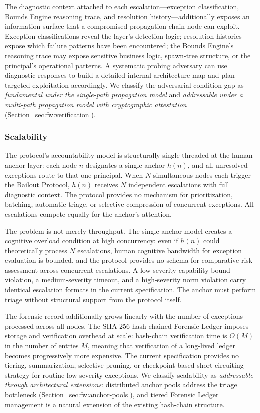The diagnostic context attached to each escalation---exception classification, Bounds Engine reasoning trace, and resolution history---additionally exposes an information surface that a compromised propagation-chain node can exploit. Exception classifications reveal the \bounds{} layer's detection logic; resolution histories expose which failure patterns have been encountered; the Bounds Engine's reasoning trace may expose sensitive business logic, spawn-tree structure, or the principal's operational patterns. A systematic probing adversary can use diagnostic responses to build a detailed internal architecture map and plan targeted exploitation accordingly. We classify the adversarial-condition gap as \emph{fundamental under the single-path propagation model} and \emph{addressable under a multi-path propagation model with cryptographic attestation} (Section~\ref{sec:fw:verification}).

\subsubsection{Scalability}
\label{sec:lim:scalability}

The protocol's accountability model is structurally single-threaded at the human anchor layer: each node $n$ designates a single anchor $h(n)$, and all unresolved exceptions route to that one principal. When $N$ simultaneous nodes each trigger the Bailout Protocol, $h(n)$ receives $N$ independent escalations with full diagnostic context. The protocol provides no mechanism for prioritization, batching, automatic triage, or selective compression of concurrent exceptions. All escalations compete equally for the anchor's attention.

The problem is not merely throughput. The single-anchor model creates a cognitive overload condition at high concurrency: even if $h(n)$ could theoretically process $N$ escalations, human cognitive bandwidth for exception evaluation is bounded, and the protocol provides no schema for comparative risk assessment across concurrent escalations. A low-severity capability-bound violation, a medium-severity timeout, and a high-severity norm violation carry identical escalation formats in the current specification. The anchor must perform triage without structural support from the protocol itself.

The forensic record additionally grows linearly with the number of exceptions processed across all nodes. The SHA-256 hash-chained Forensic Ledger imposes storage and verification overhead at scale: hash-chain verification time is $O(M)$ in the number of entries $M$, meaning that verification of a long-lived ledger becomes progressively more expensive. The current specification provides no tiering, summarization, selective pruning, or checkpoint-based short-circuiting strategy for routine low-severity exceptions. We classify scalability as \emph{addressable through architectural extensions}: distributed anchor pools address the triage bottleneck (Section~\ref{sec:fw:anchor-pools}), and tiered Forensic Ledger management is a natural extension of the existing hash-chain structure.

